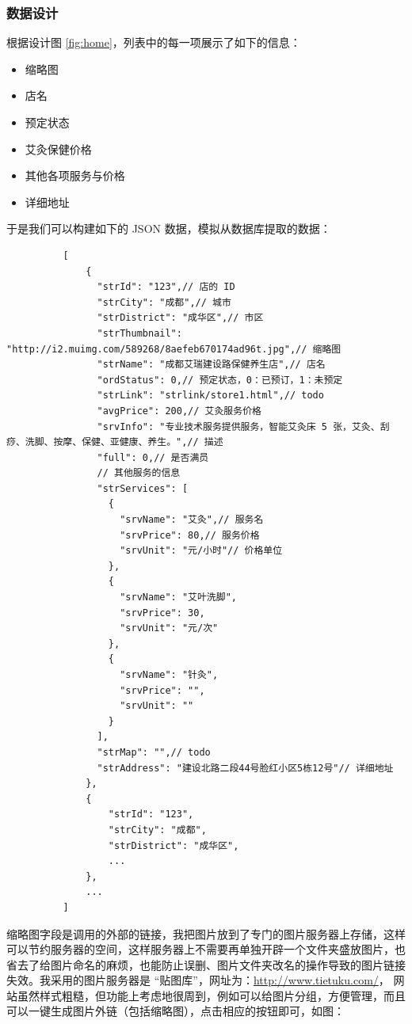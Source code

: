 \documentclass[UTF8]{ctexbook}
\begin{document}
      \subsubsection{数据设计}
        \label{subsubsec:数据设计}
        根据设计图 \ref{fig:home}，列表中的每一项展示了如下的信息：
        \begin{itemize}
          \item 缩略图
          \item 店名
          \item 预定状态
          \item 艾灸保健价格
          \item 其他各项服务与价格
          \item 详细地址
        \end{itemize}
        于是我们可以构建如下的 JSON 数据，模拟从数据库提取的数据：
        \begin{lstlisting}
          [
              {
                "strId": "123",// 店的 ID
                "strCity": "成都",// 城市
                "strDistrict": "成华区",// 市区
                "strThumbnail": "http://i2.muimg.com/589268/8aefeb670174ad96t.jpg",// 缩略图
                "strName": "成都艾瑞建设路保健养生店",// 店名
                "ordStatus": 0,// 预定状态，0：已预订，1：未预定
                "strLink": "strlink/store1.html",// todo
                "avgPrice": 200,// 艾灸服务价格
                "srvInfo": "专业技术服务提供服务，智能艾灸床 5 张，艾灸、刮痧、洗脚、按摩、保健、亚健康、养生。",// 描述
                "full": 0,// 是否满员
                // 其他服务的信息
                "strServices": [
                  {
                    "srvName": "艾灸",// 服务名
                    "srvPrice": 80,// 服务价格
                    "srvUnit": "元/小时"// 价格单位
                  },
                  {
                    "srvName": "艾叶洗脚",
                    "srvPrice": 30,
                    "srvUnit": "元/次"
                  },
                  {
                    "srvName": "针灸",
                    "srvPrice": "",
                    "srvUnit": ""
                  }
                ],
                "strMap": "",// todo
                "strAddress": "建设北路二段44号脸红小区5栋12号"// 详细地址
              },
              {
                  "strId": "123",
                  "strCity": "成都",
                  "strDistrict": "成华区",
                  ...
              },
              ...
          ]
        \end{lstlisting}
        缩略图字段是调用的外部的链接，我把图片放到了专门的图片服务器上存储，这样可以节约服务器的空间，这样服务器上不需要再单独开辟一个文件夹盛放图片，也省去了给图片命名的麻烦，也能防止误删、图片文件夹改名的操作导致的图片链接失效。我采用的图片服务器是 “贴图库”，网址为：\url{http://www.tietuku.com/}， 网站虽然样式粗糙，但功能上考虑地很周到，例如可以给图片分组，方便管理，而且可以一键生成图片外链（包括缩略图），点击相应的按钮即可，如图：
\end{document}
